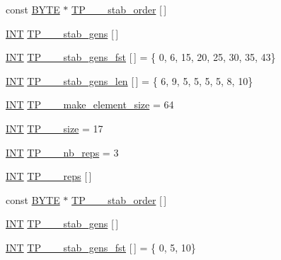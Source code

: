 \begin{DoxyCompactItemize}
\item 
const \mbox{\hyperlink{galois_8h_ab6cc7b4aeb6ea31aba2b3fbfc83ff5e6}{B\+Y\+TE}} $\ast$ \mbox{\hyperlink{data___t_p_8_c_aea420279ddb20b57d44368d755514090}{T\+P\+\_\+\_\+\_\+stab\+\_\+order}} \mbox{[}$\,$\mbox{]}
\item 
\mbox{\hyperlink{galois_8h_a09fddde158a3a20bd2dcadb609de11dc}{I\+NT}} \mbox{\hyperlink{data___t_p_8_c_abbf55310fd83f1633af9e62829066a49}{T\+P\+\_\+\_\+\_\+stab\+\_\+gens}} \mbox{[}$\,$\mbox{]}
\item 
\mbox{\hyperlink{galois_8h_a09fddde158a3a20bd2dcadb609de11dc}{I\+NT}} \mbox{\hyperlink{data___t_p_8_c_a555203fbfe1502a253f171df48f84c39}{T\+P\+\_\+\_\+\_\+stab\+\_\+gens\+\_\+fst}} \mbox{[}$\,$\mbox{]} = \{ 0, 6, 15, 20, 25, 30, 35, 43\}
\item 
\mbox{\hyperlink{galois_8h_a09fddde158a3a20bd2dcadb609de11dc}{I\+NT}} \mbox{\hyperlink{data___t_p_8_c_ae39b0ee7960709928bf1abc83130ca70}{T\+P\+\_\+\_\+\_\+stab\+\_\+gens\+\_\+len}} \mbox{[}$\,$\mbox{]} = \{ 6, 9, 5, 5, 5, 5, 8, 10\}
\item 
\mbox{\hyperlink{galois_8h_a09fddde158a3a20bd2dcadb609de11dc}{I\+NT}} \mbox{\hyperlink{data___t_p_8_c_a613f4d347df8b34977e1bc073477a511}{T\+P\+\_\+\_\+\_\+make\+\_\+element\+\_\+size}} = 64
\item 
\mbox{\hyperlink{galois_8h_a09fddde158a3a20bd2dcadb609de11dc}{I\+NT}} \mbox{\hyperlink{data___t_p_8_c_aef761f04f965ba6fddec7b0035453d7f}{T\+P\+\_\+\_\+\_\+size}} = 17
\item 
\mbox{\hyperlink{galois_8h_a09fddde158a3a20bd2dcadb609de11dc}{I\+NT}} \mbox{\hyperlink{data___t_p_8_c_a1ba796c7b1bb7db1c37ee7e5c2c2cd5a}{T\+P\+\_\+\_\+\_\+nb\+\_\+reps}} = 3
\item 
\mbox{\hyperlink{galois_8h_a09fddde158a3a20bd2dcadb609de11dc}{I\+NT}} \mbox{\hyperlink{data___t_p_8_c_a63506b47eca1c0f658917cd592f9ad58}{T\+P\+\_\+\_\+\_\+reps}} \mbox{[}$\,$\mbox{]}
\item 
const \mbox{\hyperlink{galois_8h_ab6cc7b4aeb6ea31aba2b3fbfc83ff5e6}{B\+Y\+TE}} $\ast$ \mbox{\hyperlink{data___t_p_8_c_a47d68b3677b6e9482fea2ebb78ee3514}{T\+P\+\_\+\_\+\_\+stab\+\_\+order}} \mbox{[}$\,$\mbox{]}
\item 
\mbox{\hyperlink{galois_8h_a09fddde158a3a20bd2dcadb609de11dc}{I\+NT}} \mbox{\hyperlink{data___t_p_8_c_a0c53cfc6392e75a77be70b541e685f4c}{T\+P\+\_\+\_\+\_\+stab\+\_\+gens}} \mbox{[}$\,$\mbox{]}
\item 
\mbox{\hyperlink{galois_8h_a09fddde158a3a20bd2dcadb609de11dc}{I\+NT}} \mbox{\hyperlink{data___t_p_8_c_ad686ff31036d92cbc0b76f0d746c8bfa}{T\+P\+\_\+\_\+\_\+stab\+\_\+gens\+\_\+fst}} \mbox{[}$\,$\mbox{]} = \{ 0, 5, 10\}

\end{DoxyCompactItemize}
